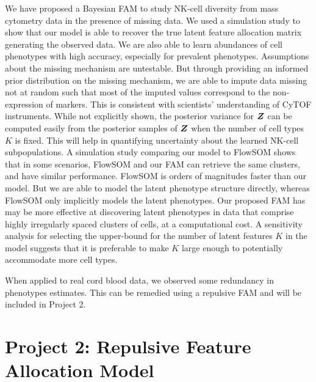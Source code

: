 \documentclass[12pt,]{article}
\newcommand{\bZ}{\mbox{\boldmath $Z$}}
\begin{document}
We have proposed a Bayesian FAM to study NK-cell diversity from mass cytometry
data in the presence of missing data. We used a simulation study to show that
our model is able to recover the true latent feature allocation matrix
generating the observed data. We are also able to learn abundances of
cell phenotypes with high accuracy, especially for prevalent phenotypes.
%
Assumptions about the missing mechanism are untestable. But through providing
an informed prior distribution on the missing mechanism, we are able to impute
data missing not at random such that most of the imputed values correspond to
the non-expression of markers. This is consistent with scientists' understanding
of CyTOF instruments.
%
While not explicitly shown, the posterior variance for $\bZ$ can be computed
easily from the posterior samples of $\bZ$ when the number of cell types $K$ is
fixed. This will help in quantifying uncertainty about the learned NK-cell
subpopulations. 
%
A simulation study comparing our model to FlowSOM shows that in some
scenarios, FlowSOM and our FAM can retrieve the same clusters, and have similar
performance. FlowSOM is orders of magnitudes faster than our model.  But we are
able to model the latent phenotype structure directly, whereas FlowSOM only
implicitly models the latent phenotypes. Our proposed FAM has may be
more effective at discovering latent phenotypes in data that comprise highly
irregularly spaced clusters of cells, at a computational cost.
%
%
A sensitivity analysis for selecting the upper-bound for the number of latent
features $K$ in the model suggests that it is preferable to make $K$ large
enough to potentially accommodate more cell types.

When applied to real cord blood data, we observed some redundancy in phenotypes estimates. This can be remedied
using a repulsive FAM and will be included in Project 2.






\section{Project 2: Repulsive Feature Allocation Model}\label{sec:proj2}
\end{document}
